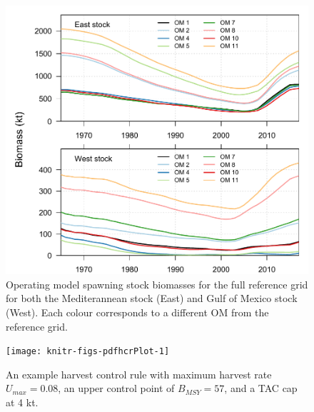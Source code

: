 \documentclass[]{article}
\newcommand{\blandscape}{\begin{landscape}}
\newcommand{\elandscape}{\end{landscape}}
\begin{document}
\begin{figure}[htb]

{\centering \includegraphics[width=0.9\linewidth]{data/OMbiomass} 

}

\caption{Operating model spawning stock biomasses for the full reference grid for both the Mediterannean stock (East) and Gulf of Mexico stock (West). Each colour corresponds to a different OM from the reference grid.}\label{fig:OMbioPlot}
\end{figure}

\newpage

\blandscape

\begin{figure}[htb]

{\centering \texttt{[image: knitr-figs-pdfhcrPlot-1]} 

}

\caption{An example harvest control rule with maximum harvest rate $U_{max} =  0.08$, an upper control point of $B_{MSY} = 57$, and a TAC cap at 4 kt.}\label{fig:hcrPlot}
\end{figure}
\elandscape

\newpage
\end{document}

